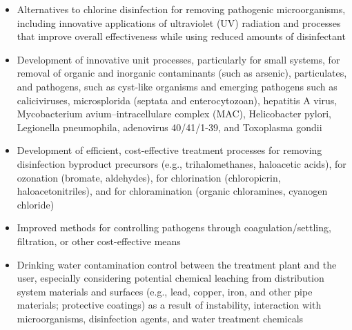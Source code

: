 \begin{itemize}
\item Alternatives to chlorine disinfection for removing pathogenic microorganisms, including innovative applications of ultraviolet (UV) radiation and processes that improve overall effectiveness while using reduced amounts of disinfectant
\item Development of innovative unit processes, particularly for small systems, for removal of organic and inorganic contaminants (such as arsenic), particulates, and pathogens, such as cyst-like organisms and emerging pathogens such as caliciviruses, microsplorida (septata and enterocytozoan), hepatitis A virus, Mycobacterium avium–intracellulare complex (MAC), Helicobacter pylori, Legionella pneumophila, adenovirus 40/41/1-39, and Toxoplasma gondii
\item Development of efficient, cost-effective treatment processes for removing disinfection byproduct precursors (e.g., trihalomethanes, haloacetic acids), for ozonation (bromate, aldehydes), for chlorination (chloropicrin, haloacetonitriles), and for chloramination (organic chloramines, cyanogen chloride)
\item Improved methods for controlling pathogens through coagulation/settling, filtration, or other cost-effective means
\item Drinking water contamination control between the treatment plant and the user, especially considering potential chemical leaching from distribution system materials and surfaces (e.g., lead, copper, iron, and other pipe materials; protective coatings) as a result of instability, interaction with microorganisms, disinfection agents, and water treatment chemicals
\end{itemize}


